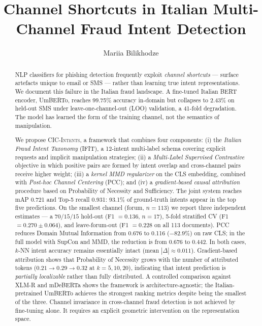 \documentclass[preprint,12pt,authoryear]{elsarticle}
\begin{document}
\begin{frontmatter}

\title{Channel Shortcuts in Italian Multi-Channel Fraud Intent Detection}

\author[unipv]{Mariia Bilikhodze}


\begin{abstract}
NLP classifiers for phishing detection frequently exploit
\emph{channel shortcuts} --- surface artefacts unique to email or SMS
--- rather than learning true intent representations. We document
this failure in the Italian fraud landscape. A fine-tuned Italian
BERT encoder, UmBERTo, reaches 99.75\% accuracy in-domain but
collapses to 2.43\% on held-out SMS under leave-one-channel-out
(LOO) validation, a 41-fold degradation. The model has learned the
form of the training channel, not the semantics of manipulation.

We propose \textsc{CIC-Intents}, a framework that combines four
components: (i) the \emph{Italian Fraud Intent Taxonomy} (IFIT), a
12-intent multi-label schema covering explicit requests and implicit
manipulation strategies; (ii) a \emph{Multi-Label Supervised
Contrastive} objective in which positive pairs are formed by intent
overlap and cross-channel pairs receive higher weight; (iii) a
\emph{kernel MMD regularizer} on the CLS embedding, combined with
\emph{Post-hoc Channel Centering} (PCC); and (iv) a
\emph{gradient-based causal attribution} procedure based on
Probability of Necessity and Sufficiency. The joint system reaches
mAP 0.721 and Top-5 recall 0.931: 93.1\% of ground-truth intents
appear in the top five predictions. On the smallest channel
(forum, $n=113$) we report three independent estimates --- a
$70/15/15$ hold-out (F1 $=0.136$, $n=17$), 5-fold stratified CV
(F1 $=0.270\pm0.064$), and leave-forum-out (F1 $=0.228$ on all 113
documents). PCC reduces Domain Mutual Information from 0.676 to
0.116 ($-82.9\%$) on raw CLS; in the full model with SupCon and MMD,
the reduction is from 0.676 to 0.442. In both cases, $k$-NN intent
accuracy remains essentially intact (mean $|\Delta| \approx 0.011$).
Gradient-based attribution shows that Probability of Necessity grows
with the number of attributed tokens ($0.21 \to 0.29 \to 0.32$ at
$k=5,10,20$), indicating that intent prediction is \emph{partially
localizable} rather than fully distributed. A controlled comparison
against XLM-R and mDeBERTa shows the framework is
architecture-agnostic; the Italian-pretrained UmBERTo achieves the
strongest ranking metrics despite being the smallest of the three.
Channel invariance in cross-channel fraud detection is not achieved
by fine-tuning alone. It requires an explicit geometric intervention
on the representation space.
\end{abstract}


\end{frontmatter}
\end{document}
